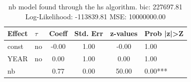 \begin{table}
	\caption{nb model found through the hs algorithm. bic: 227697.81 Log-Likelihood: -113839.81 MSE: 10000000.00}
	\begin{center}
		\begin{tabular}{|l|l|c|c|c|l|}
			\hline
			Effect & $\tau$ & Coeff & Std. Err & z-values & Prob |z|>Z \\
			\hline
			const & no & -0.00 & 1.00 & -0.00 & 1.00 \\
			\hline
			YEAR & no & 0.00 & 1.00 & 0.00 & 1.00 \\
			\hline
			nb &  & 0.77 & 0.00 & 50.00 & 0.00*** \\
			\hline
		\end{tabular}
	\end{center}
\end{table}